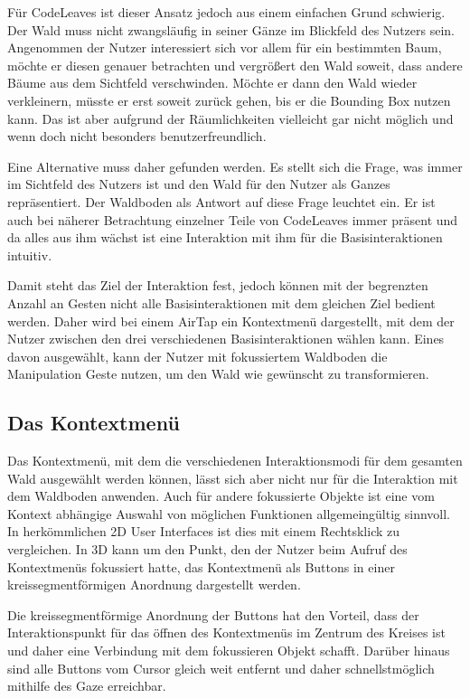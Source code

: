 Für CodeLeaves ist dieser Ansatz jedoch aus einem einfachen Grund schwierig. Der Wald muss nicht zwangsläufig in seiner Gänze im Blickfeld des Nutzers sein. Angenommen der Nutzer interessiert sich vor allem für ein bestimmten Baum, möchte er diesen genauer betrachten und vergrößert den Wald soweit, dass andere Bäume aus dem Sichtfeld verschwinden. Möchte er dann den Wald wieder verkleinern, müsste er erst soweit zurück gehen, bis er die Bounding Box nutzen kann. Das ist aber aufgrund der Räumlichkeiten vielleicht gar nicht möglich und wenn doch nicht besonders benutzerfreundlich.

Eine Alternative muss daher gefunden werden. Es stellt sich die Frage, was immer im Sichtfeld des Nutzers ist und den Wald für den Nutzer als Ganzes repräsentiert. Der Waldboden als Antwort auf diese Frage leuchtet ein. Er ist auch bei näherer Betrachtung einzelner Teile von CodeLeaves immer präsent und da alles aus ihm wächst ist eine Interaktion mit ihm für die Basisinteraktionen intuitiv.

Damit steht das Ziel der Interaktion fest, jedoch können mit der begrenzten Anzahl an Gesten nicht alle Basisinteraktionen mit dem gleichen Ziel bedient werden. Daher wird bei einem AirTap ein Kontextmenü dargestellt, mit dem der Nutzer zwischen den drei verschiedenen Basisinteraktionen wählen kann. Eines davon ausgewählt, kann der Nutzer mit fokussiertem Waldboden die Manipulation Geste nutzen, um den Wald wie gewünscht zu transformieren.

\subsection{Das Kontextmenü}
Das Kontextmenü, mit dem die verschiedenen Interaktionsmodi für dem gesamten Wald ausgewählt werden können, lässt sich aber nicht nur für die Interaktion mit dem Waldboden anwenden. Auch für andere fokussierte Objekte ist eine vom Kontext abhängige Auswahl von möglichen Funktionen allgemeingültig sinnvoll. In herkömmlichen 2D User Interfaces ist dies mit einem Rechtsklick zu vergleichen. In 3D kann um den Punkt, den der Nutzer beim Aufruf des Kontextmenüs fokussiert hatte, das Kontextmenü als Buttons in einer kreissegmentförmigen Anordnung dargestellt werden. 

Die kreissegmentförmige Anordnung der Buttons hat den Vorteil, dass der Interaktionspunkt für das öffnen des Kontextmenüs im Zentrum des Kreises ist und daher eine Verbindung mit dem fokussieren Objekt schafft. Darüber hinaus sind alle Buttons vom Cursor gleich weit entfernt und daher schnellstmöglich mithilfe des Gaze erreichbar.

